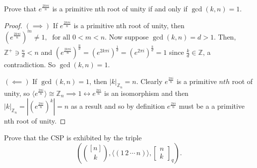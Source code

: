 \documentclass[addpoints,10pt]{exam}
\theoremstyle{plain}
\theoremstyle{definition}
\newtheorem{prob}[thm]{Problem}
\theoremstyle{plain}
\theoremstyle{plain}
\theoremstyle{definition}
\let\oldprob\prob
\let\endoldprob\endprob
\renewenvironment{prob}
  {\begin{singlespace}\oldprob}
  {\endoldprob\end{singlespace}}
\newcommand{\ZZ}{\ensuremath{\mathbb{Z}}}
\begin{document}
\begin{prob}
Prove that $e^{\frac{2k\pi i}{n}}$ is a primitive nth root of unity if and only if $\gcd(k,n) = 1$.
\end{prob}
\begin{proof}
$(\implies)$ If $e^{\frac{2k\pi i}{n}}$ is a primitive nth root of unity, then $(e^{\frac{2k\pi i}{n}})^{m}\neq 1,\;\text{ for all } 0<m<n$. Now suppose $\gcd(k,n)=d>1.$ Then, $\ZZ^{+}\ni\frac{n}{d}<n$ and $(e^{\frac{2k\pi i}{n}})^{\frac{n}{d}}=(e^{2k\pi i})^{\frac{1}{d}}=(e^{2\pi i})^{\frac{k}{d}}=1$ since $\frac{k}{d}\in \ZZ$, a contradiction. So $\gcd(k,n) = 1$.

$(\impliedby)$ If $\gcd(k,n) = 1$, then $|k|_{\ZZ_{n}}=n$. Clearly $e^{\frac{2\pi i}{n}}$ is a primitive $nth$ root of unity, so $\langle e^{\frac{2\pi i}{n}}\rangle\cong \ZZ_{n}\implies 1\longleftrightarrow e^{\frac{2\pi i}{n}}$ is an isomorphism and then $|k|_{\ZZ_{n}}=|(e^{\frac{2\pi i}{n}})^{k}|=n$ as a result and so by definition $e^{\frac{2\pi i}{n}}$ must be a a primitive nth root of unity.

\end{proof}


\newpage
\setcounter{thm}{30}
\renewcommand{\thethm}{\arabic{thm}(b)}
\begin{prob}
Prove that the CSP is exhibited by the triple
$$\left(\binom{[n]}{k},
\langle (1\,2\,\cdots\,n)\rangle,
\begin{bmatrix}
n\\
k
\end{bmatrix}_q \right).$$
\end{prob}
\end{document}

